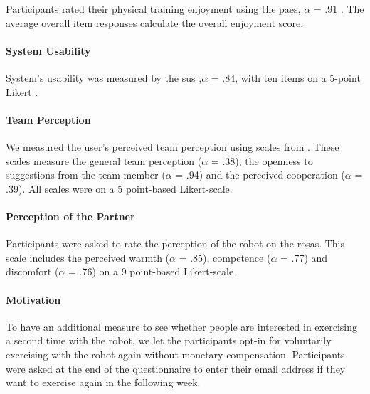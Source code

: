\documentclass[twocolumn]{svjour3}          %
\begin{document}
Participants rated their physical training enjoyment using the \gls{paes}, \(\alpha\) = .91
\autocite{kendzierski1991physical}. The average overall item responses
calculate the overall enjoyment score.

\hypertarget{system-usability}{%
\paragraph{System Usability}\label{system-usability}}

System's usability was measured by the \gls{sus}
,\(\alpha\) = .84, with ten items on a 5-point Likert
\autocite{brooke1996sus}.

\hypertarget{team-perception}{%
\paragraph{Team Perception}\label{team-perception}}

We measured the user's perceived team perception using scales from
\autocite{nass1996can}. These scales measure the general team perception
(\(\alpha\) = .38), the openness to suggestions from the team member
(\(\alpha\) = .94) and the perceived cooperation (\(\alpha\) = .39).
All scales were on a 5 point-based Likert-scale.

\hypertarget{perception-of-the-partner}{%
\paragraph{Perception of the
Partner}\label{perception-of-the-partner}}

Participants were asked to rate the perception of the robot on the
\gls{rosas}. This scale includes the
perceived warmth (\(\alpha\) = .85), competence (\(\alpha\) = .77) and
discomfort (\(\alpha\) = .76) on a 9 point-based Likert-scale
\autocite{carpinella2017robotic}.

\hypertarget{motivation}{%
\paragraph{Motivation}\label{motivation}}

To have an additional measure to see whether people are interested in
exercising a second time with the robot, we let the participants opt-in
for voluntarily exercising with the robot again without monetary
compensation. Participants were asked at the end of the questionnaire to
enter their email address if they want to exercise again in the
following week.
\end{document}
